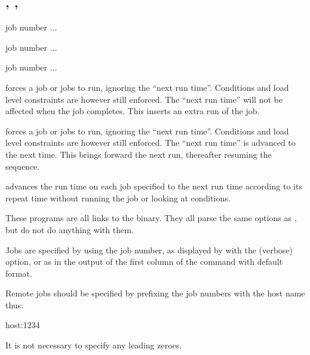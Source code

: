\subsection{\BtjgoName, \BtjgoadvName, \BtjadvName}

\begin{expara}

\BtjgoName{} job number ...

\BtjgoadvName{} job number ...

\BtjadvName{} job number ...

\end{expara}

\PrBtjgo{} forces a job or jobs to run, ignoring the ``next run time''. Conditions and load level
constraints are however still enforced. The ``next run time'' will not be affected when the job completes. This
inserts an extra run of the job.

\PrBtjgoadv{} forces a job or jobs to run, ignoring the ``next run time''. Conditions and load
level constraints are however still enforced. The ``next run time'' is advanced to the next time. This brings
forward the next run, thereafter resuming the sequence.

\PrBtjadv{} advances the run time on each job specified to the next run time according to its repeat time without
running the job or looking at conditions.

These programs are all links to the \PrBtjdel{} binary. They all parse the same options as \PrBtjdel, but do not do anything with them.

Jobs are specified by using the job number, as displayed by \PrBtr{} with the 
(verbose) option, or as in the output of the first column of the \PrBtjlist{} command with default format.

Remote jobs should be specified by prefixing the job numbers with the host name thus:

\begin{expara}

host:1234

\end{expara}

It is not necessary to specify any leading zeroes.

